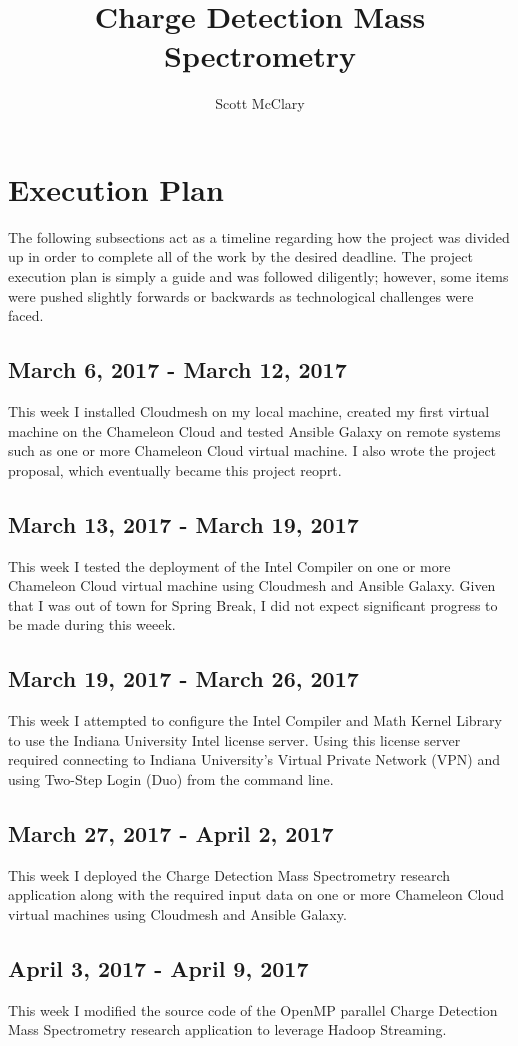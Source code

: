 \documentclass[9pt,twocolumn,twoside]{../../styles/osajnl}
\title{Charge Detection Mass Spectrometry}
\author[1,*]{Scott McClary}
\affil[1]{School of Informatics and Computing, Bloomington, IN 47408, U.S.A.}
\affil[*]{Corresponding authors: scmcclar@indiana.edu}
\begin{document}
\maketitle

\section{Execution Plan} \label{plan}
The following subsections act as a timeline regarding how the project
was divided up in order to complete all of the work by the desired
deadline. The project execution plan is simply a guide and was
followed diligently; however, some items were pushed slightly forwards
or backwards as technological challenges were faced.
\subsection{March 6, 2017 - March 12, 2017}
This week I installed Cloudmesh on my local machine, created my first
virtual machine on the Chameleon Cloud and tested Ansible Galaxy on
remote systems such as one or more Chameleon Cloud virtual machine. I
also wrote the project proposal, which eventually became this project
reoprt.
\subsection{March 13, 2017 - March 19, 2017}
This week I tested the deployment of the Intel Compiler on one or more
Chameleon Cloud virtual machine using Cloudmesh and Ansible
Galaxy. Given that I was out of town for Spring Break, I did not
expect significant progress to be made during this weeek.
\subsection{March 19, 2017 - March 26, 2017}
This week I attempted to configure the Intel Compiler and Math Kernel
Library to use the Indiana University Intel license server. Using this
license server required connecting to Indiana University's Virtual
Private Network (VPN) and using Two-Step Login (Duo) from the command
line.
\subsection{March 27, 2017 - April 2, 2017}
This week I deployed the Charge Detection Mass Spectrometry research
application along with the required input data on one or more
Chameleon Cloud virtual machines using Cloudmesh and Ansible Galaxy.
\subsection{April 3, 2017 - April 9, 2017}
This week I modified the source code of the OpenMP parallel Charge
Detection Mass Spectrometry research application to leverage Hadoop
Streaming.
\end{document}
